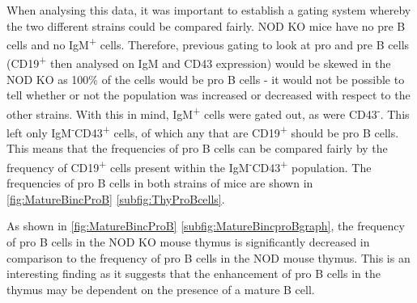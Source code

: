 When analysing this data, it was important to establish a gating system whereby the two different strains could be compared fairly.
NOD KO mice have no pre B cells and no IgM\textsuperscript{+} cells. Therefore, previous gating to look at pro and pre B cells (CD19\textsuperscript{+} then analysed on IgM and CD43 expression) would be skewed in the NOD KO as 100\% of the cells would be pro B cells - it would not be possible to tell whether or not the population was increased or decreased with respect to the other strains.
With this in mind, IgM\textsuperscript{+} cells were gated out, as were CD43\textsuperscript{-}.
This left only IgM\textsuperscript{-}CD43\textsuperscript{+} cells, of which any that are CD19\textsuperscript{+} should be pro B cells.
This means that the frequencies of pro B cells can be compared fairly by the frequency of CD19\textsuperscript{+} cells present within the IgM\textsuperscript{-}CD43\textsuperscript{+} population.
The frequencies of pro B cells in both strains of mice are shown in \cref{fig:MatureBincProB} \ref{subfig:ThyProBcells}.


As shown in \cref{fig:MatureBincProB} \ref{subfig:MatureBincproBgraph}, the frequency of pro B cells in the NOD KO mouse thymus is significantly decreased in comparison to the frequency of pro B cells in the NOD mouse thymus.
This is an interesting finding as it suggests that the enhancement of pro B cells in the thymus may be dependent on the presence of a mature B cell.


